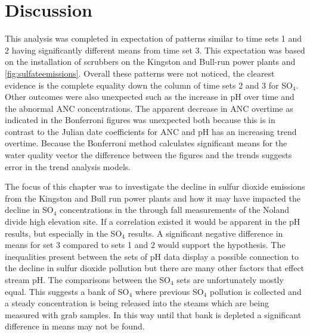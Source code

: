 \section{Discussion}
This analysis was completed in expectation of patterns similar to time sets 1 and 2 having significantly different means from time set 3.
This expectation was based on the installation of scrubbers on the Kingston and Bull-run power plants and \autoref{fig:sulfateemissions}.
Overall these patterns were not noticed, the clearest evidence is the complete equality down the column of time sets 2 and 3 for SO$_4$.
Other outcomes were also unexpected such as the increase in pH over time and the abnormal ANC concentrations.
The apparent decrease in ANC overtime as indicated in the Bonferroni figures was unexpected both because this is in contrast to the Julian date coefficients for ANC and pH has an increasing trend overtime.
Because the Bonferroni method calculates significant means for the water quality vector the difference between the figures and the trends suggests error in the trend analysis models.

The focus of this chapter was to investigate the decline in sulfur dioxide emissions from the Kingston and Bull run power plants and how it may have impacted the decline in SO$_4$  concentrations in the through fall measurements of the Noland divide high elevation site.
If a correlation existed it would be apparent in the pH results, but especially in the SO$_4$ results.
A significant negative difference in means for set 3 compared to sets 1 and 2 would support the hypothesis.
The inequalities present between the sets of pH data display a possible connection to the decline in sulfur dioxide pollution but there are many other factors that effect stream pH.
The comparisons between the SO$_4$ sets are unfortunately mostly equal.
This suggests a bank of SO$_4$ where previous SO$_4$ pollution is collected and a steady concentration is being released into the steams which are being measured with grab samples.
In this way until that bank is depleted a significant difference in means may not be found.
